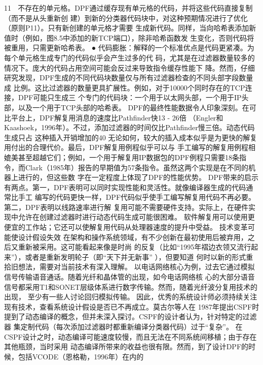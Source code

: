                                                     11
   不存在的单元格。DPF通过缓存现有单元格的代码，并将这些代码直接复制（而不是从头重新创
   建）到新的分类器代码块中，对这种预期情况进行了优化（原则P11）。只有新创建的单元格才需要
   生成新代码。同样，当向哈希表添加新值时（例如，图8.5中添加的新TCP端口），除非哈希函数发
   生变化，否则代码将被重用，只需更新哈希表。
 ● 代码膨胀：解释的一个标准优点是代码更紧凑。为每个单元格生成专门的代码似乎会产生过多的代
   码，尤其是在过滤器数量较多的情况下。庞大的代码占用空间可能会反过来导致指令缓存性能下
   降。然而，仔细研究发现，DPF生成的不同代码块数量仅与所有过滤器检查的不同头部字段数量成
   比例。这比过滤器的数量更具扩展性。例如，对于10000个同时存在的TCP连接，DPF可能只生成三
   个专门的代码块：一个用于以太网头部，一个用于IP头部，以及一个用于TCP头部的哈希表。
DPF的最终性能数据令人印象深刻。在可比平台上，DPF解复用消息的速度比Pathfinder快13 - 26倍
（Engler和Kaashoek，1996年）。不过，添加过滤器的时间仅比Pathfinder慢三倍。动态代码生成只占
这种插入开销增加的40%
无论如何，较大的插入成本似乎是为更快的解复用付出的合理代价。最后，DPF解复用例程似乎可以与
手工编写的解复用例程相媲美甚至超越它们；例如，一个用于解复用IP数据包的DPF例程只需要18条指
令，而Clark（1985年）报告的早期值为57条指令。虽然这两个实现是在不同的机器上进行的，但这些数
字在一定程度上体现了DPF的性能优势。
DPF带来的启示有两点。第一，DPF表明可以同时实现性能和灵活性。就像编译器生成的代码通常比手工
编写的代码更快一样，DPF代码似乎使手工编写解复用代码不再必要。第二，DPF表明以线路速率进行解
复用可能不需要硬件支持。实际上，在硬件实现中允许在创建过滤器时进行动态代码生成可能很困难。
软件解复用可以使用更便宜的工作站；它还可以使解复用代码从处理器速度的提升中受益。
技术变革可能使设计假设失效
在架构和操作系统领域，有不少创新在最初使用后被弃用，之后又重新被采用。这可能看起来像是时尚
的反复（比如“1995年褶边衣领又流行起来”），或者是重新发明轮子（即“天下并无新事” ），但要知道
何时以新的形式重拾旧想法，需要对当前技术有深入理解。
以电话网络核心为例，过去它通过模拟信号传输语音通话。随着光纤和晶体管的出现，如今电话网络核
心的大部分语音信号都采用T1和SONET层级体系进行数字传输。然而，随着光纤波分复用技术的出现，
至少有一些人讨论回归模拟传输。
因此，优秀的系统设计师必须持续关注现有技术，查看系统设计假设是否已不再成立。莫古尔等人在
1987年提出CSPF时提到了动态编译的概念，但并未深入探讨。CSPF的设计者认为，针对特定的过滤器
集定制代码（每次添加过滤器时都重新编译分类器代码）过于“复杂”。
在CSPF设计之时，动态编译可能速度较慢，而且无法在不同系统间移植；由于存在其他瓶颈，当时采用
动态编译所带来的收益也很有限。然而，到了设计DPF的时候，包括VCODE（恩格勒，1996年）在内的

